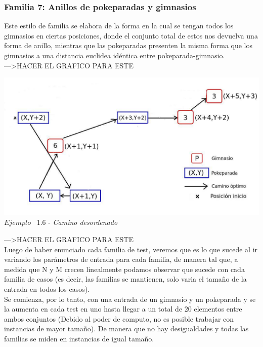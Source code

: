\begin{center}
  \subsubsection*{Familia 7: Anillos de pokeparadas y gimnasios}
\end{center}

Este estilo de familia se elabora de la forma en la cual se tengan todos los gimnasios en ciertas posiciones, donde el conjunto total de estos nos devuelva una forma de anillo, mientras que las pokeparadas presenten la misma forma que los gimnasios a una distancia euclidea id\'entica entre pokeparada-gimnasio.\\

--->HACER EL GRAFICO PARA ESTE
\vspace*{0.3cm} \vspace*{0.3cm}
  \begin{center}
 \includegraphics[scale=0.6]{./EJ1/desorden.jpeg}
\\ {$Ejemplo$ \ 1.6 - \textit{Camino desordenado}}
  \end{center}
  \vspace*{0.3cm}
--->HACER EL GRAFICO PARA ESTE\\


\indent Luego de haber enunciado cada familia de test, veremos que es lo que sucede al ir variando los parámetros de entrada para cada familia, de manera tal que, a medida que N y M crecen linealmente podamos observar que sucede con cada familia de casos (es decir, las familias se mantienen, solo varia el tamaño de la entrada en todos los casos).\\
Se comienza, por lo tanto, con una entrada de un gimnasio y un pokeparada y se la aumenta en cada test en uno hasta llegar a un total de 20 elementos entre ambos conjuntos (Debido al poder de computo, no es posible trabajar con instancias de mayor tamaño). De manera que no hay desigualdades y todas las familias se miden en instancias de igual tamaño.\\

